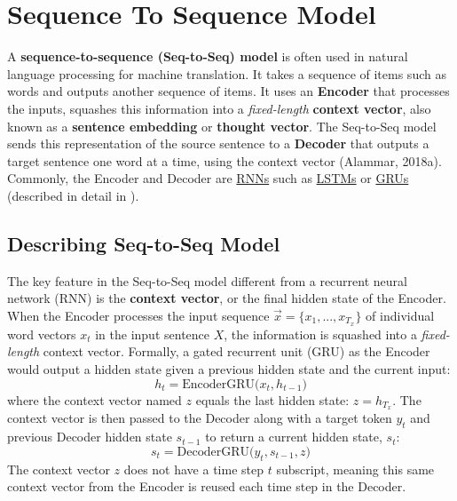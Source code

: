 \section{Sequence To Sequence Model} \label{sec:Seq2Seq}

A \textbf{sequence-to-sequence (Seq-to-Seq) model} is often used in natural language processing for machine translation. It takes a sequence of items such as words and outputs another sequence of items. It uses an \textbf{Encoder} that processes the inputs, squashes this information into a \emph{fixed-length} \textbf{context vector}, also known as a \textbf{sentence embedding} or \textbf{thought vector}. The Seq-to-Seq model sends this representation of the source sentence to a \textbf{Decoder} that outputs a target sentence one word at a time, using the context vector (Alammar, 2018a). Commonly, the Encoder and Decoder are \hyperref[sec:RNN]{RNNs} such as \hyperref[sec:LSTM]{LSTMs} or \hyperref[sec:GRU]{GRUs} (described in detail in ).


\subsection{Describing Seq-to-Seq Model}

The key feature in the Seq-to-Seq model different from a recurrent neural network (RNN) is the \textbf{context vector}, or the final hidden state of the Encoder. When the Encoder processes the input sequence $\overrightarrow{x} = \{ x_1, ..., x_{T_x} \}$ of individual word vectors $x_t$ in the input sentence $X$, the information is squashed into a \emph{fixed-length} context vector. Formally, a gated recurrent unit (GRU) as the Encoder would output a hidden state given a previous hidden state and the current input: 
$$
h_t = \text{EncoderGRU} \Big( x_t, h_{t-1} \Big)
$$ 
where the context vector named $z$ equals the last hidden state: $z = h_{T_x}$. 
\newline 
The context vector is then passed to the Decoder along with a target token $y_t$ and previous Decoder hidden state $s_{t-1}$ to return a current hidden state, $s_t$:
$$
s_t = \text{DecoderGRU} \Big( y_t, s_{t-1}, z \Big)
$$
The context vector $z$ does not have a time step $t$ subscript, meaning this same context vector from the Encoder is reused each time step in the Decoder. 


